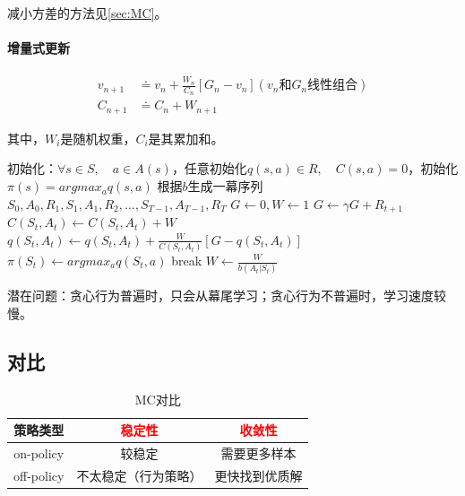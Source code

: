 \documentclass[
12pt, %
a4paper, 
oneside, %
]{scrartcl}
\begin{document}
减小方差的方法见\ref{sec:MC}。
\paragraph{增量式更新}
\begin{align*}
v_{n + 1} &\doteq v_n + \frac{W_n}{C_n}[G_n - v_n] (v_n \text{和} G_n \text{线性组合}) \\
C_{n + 1} &\doteq C_n + W_{n + 1}
\end{align*}

其中，$ W_i $是随机权重，$ C_i $是其累加和。
\begin{myalgorithm}
\State 初始化：$ \forall s \in S, \quad a \in A(s) $，任意初始化$ q(s, a) \in R, \quad C(s, a) = 0 $，初始化$ \pi(s) = argmax_a q(s, a) $ 
\Loop
\State 根据$ b $生成一幕序列$ S_0, A_0, R_1, S_1, A_1, R_2, \dots, S_{T - 1}, A_{T - 1}, R_T $ 
\State $ G \gets 0, W \gets 1 $
\State $ G \gets \gamma G + R_{t + 1} $
\State $ C(S_t, A_t) \gets C(S_t, A_t) + W $
\State $ q(S_t ,A_t) \gets q(S_t, A_t) + \frac{W}{C(S_t, A_t)}[G - q(S_t, A_t)] $ 
\State $ \pi(S_t) \gets argmax_a q(S_t,a) $
\State break 
\EndIf
\State $ W \gets \frac{W}{b(A_t|S_t)} $ 
\EndFor
\EndLoop
\end{myalgorithm}

潜在问题：贪心行为普遍时，只会从幕尾学习；贪心行为不普遍时，学习速度较慢。
\subsection[对比]{对比}
\begin{table}[H]
\centering
\begin{tabular}{|c|c|c|}
\hline
策略类型 & \textcolor{red}{稳定性} & \textcolor{red}{收敛性} \\
\hline
on-policy & 较稳定 & 需要更多样本 \\
\hline
off-policy & 不太稳定（行为策略） & 更快找到优质解 \\
\hline
\end{tabular}
\caption{MC对比}
\end{table}
\end{document}
